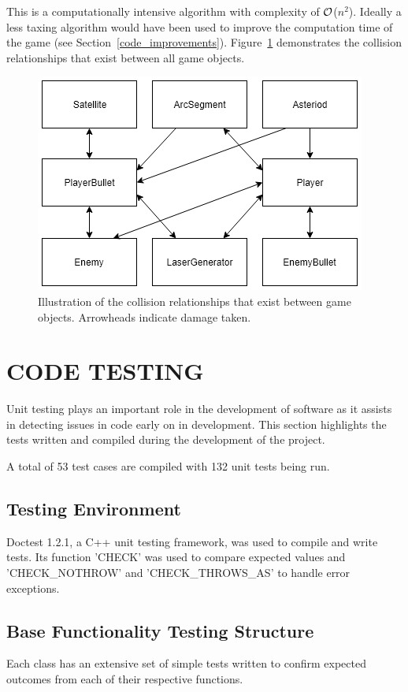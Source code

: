 \documentclass[10pt,twocolumn]{witseiepaper}
\begin{document}
This is a computationally intensive algorithm with complexity of $\cal{O}$($n^{2}$). Ideally a less taxing algorithm would have been used to improve the computation time of the game (see Section~\ref{code_improvements}). Figure~\ref{fig:collisions} demonstrates the collision relationships that exist between all game objects.

\begin{figure}[H]
	\centering
	\includegraphics[width=0.9\columnwidth]{collisions.png}
	\caption{Illustration of the collision relationships that exist between game objects. Arrowheads indicate damage taken.}
	\raggedright
	\label{fig:collisions}
\end{figure}


\section{CODE TESTING}
Unit testing plays an important role in the development of software as it assists in detecting issues in code early on in development.
This section highlights the tests written and compiled during the development of the project. 

A total of 53 test cases are compiled with 132 unit tests being run.

\subsection{Testing Environment}
Doctest 1.2.1, a C++ unit testing framework, was used to compile and write tests. Its function 'CHECK' was used to compare expected values and 'CHECK\_NOTHROW' and 'CHECK\_THROWS\_AS' to handle error exceptions.
 
\subsection{Base Functionality Testing Structure}
Each class has an extensive set of simple tests written to confirm expected outcomes from each of their respective functions. 
\end{document}
